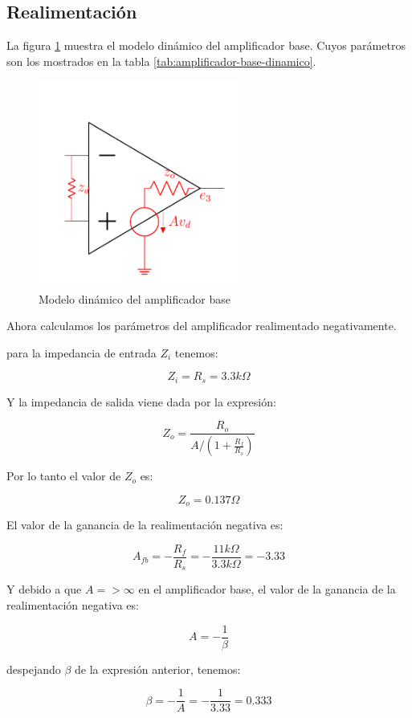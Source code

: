 \subsection{Realimentación}
La figura \ref{fig:amplificador-base} muestra el modelo dinámico del amplificador base. Cuyos parámetros son los mostrados en la tabla \ref{tab:amplificador-base-dinamico}.

\begin{figure}[ht]
    \centering
    \includegraphics[width=0.6\textwidth]{src/images/p5/modelo-amplificador.png}
    \caption{Modelo dinámico del amplificador base}
    \label{fig:amplificador-base}
\end{figure}
Ahora calculamos los parámetros del amplificador realimentado negativamente.

para la impedancia de entrada $Z_i$ tenemos:

$$Z_i = R_s = 3.3 k\Omega$$

Y la impedancia de salida viene dada por la expresión:

$$Z_o = \frac{R_o}{A / (1 + \frac{R_f}{R_s})}$$

Por lo tanto el valor de $Z_o$ es:

$$Z_o = 0.137 \Omega$$

El valor de la ganancia de la realimentación negativa es: 

$$A_{fb} = - \frac{R_f}{R_s} = - \frac{11k\Omega}{3.3k\Omega} = -3.33$$

Y debido a que $A => \infty$ en el amplificador base, el valor de la ganancia de la realimentación negativa es:

$$A = -\frac{1}{\beta}$$

despejando $\beta$ de la expresión anterior, tenemos:

$$\beta = -\frac{1}{A} = -\frac{1}{3.33} = 0.333$$

